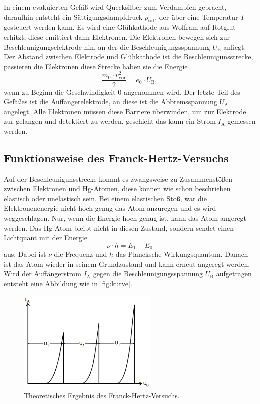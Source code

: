In einem evakuierten Gefäß wird Quecksilber zum Verdampfen gebracht, daraufhin entsteht ein Sättigungsdampfdruck $p_\text{sät}$, der über eine Temperatur $T$ gesteuert werden kann.
Es wird eine Glühkathode aus Wolfram auf Rotglut erhitzt, diese emittiert dann Elektronen.
Die Elektronen bewegen sich zur Beschleunigungselektrode hin, an der die Beschleunigungsspannung $U_\text{B}$ anliegt. 
Der Abstand zwischen Elektrode und Glühkathode ist die Beschleunigunsstrecke, passieren die Elektronen diese Strecke haben sie die Energie
\begin{equation}
    \frac{m_0 \cdot v^2_\text{vor}}{2} = e_0 \cdot U_\text{B},
    \label{eq:beschleu}
\end{equation}
wenn zu Beginn die Geschwindigkeit 0 angenommen wird.
Der letzte Teil des Gefäßes ist die Auffängerelektrode, an diese ist die Abbremsspannung $U_\text{A}$ angelegt.
Alle Elektronen müssen diese Barriere überwinden, um zur Elektrode zur gelangen und detektiert zu werden, geschieht das kann ein Strom $I_\text{A}$ gemessen werden.

\subsection{Funktionsweise des Franck-Hertz-Versuchs}
\label{ssec:funktion}

Auf der Beschleunigunsstrecke kommt es zwangsweise zu Zusammenstößen zwischen Elektronen und Hg-Atomen, diese können wie schon beschrieben elastisch oder unelastisch sein.
Bei einem elastischen Stoß, war die Elektronenenergie nicht hoch genug das Atom anzuregen und es wird weggeschlagen.
Nur, wenn die Energie hoch genug ist, kann das Atom angeregt werden.
Das Hg-Atom bleibt nicht in diesen Zustand, sondern sendet einen Lichtquant mit der Energie
\begin{equation}
    \nu \cdot h = E_1 - E_0
    \label{eq:quant}
\end{equation}
aus, Dabei ist $\nu$ die Frequenz und $h$ das Plancksche Wirkungsquantum.
Danach ist das Atom wieder in seinem Grundzustand und kann erneut angeregt werden.
Wird der Auffängerstrom $I_\text{A}$ gegen die Beschleunigungsspannung $U_\text{B}$ aufgetragen entsteht eine Abbildung wie in \autoref{fig:kurve}.

\begin{figure}
    \centering
    \includegraphics[width=0.6\textwidth]{images/bild2.png}
    \caption{Theoretisches Ergebnis des Franck-Hertz-Versuchs.\cite{V601}}
    \label{fig:kurve}
\end{figure}

